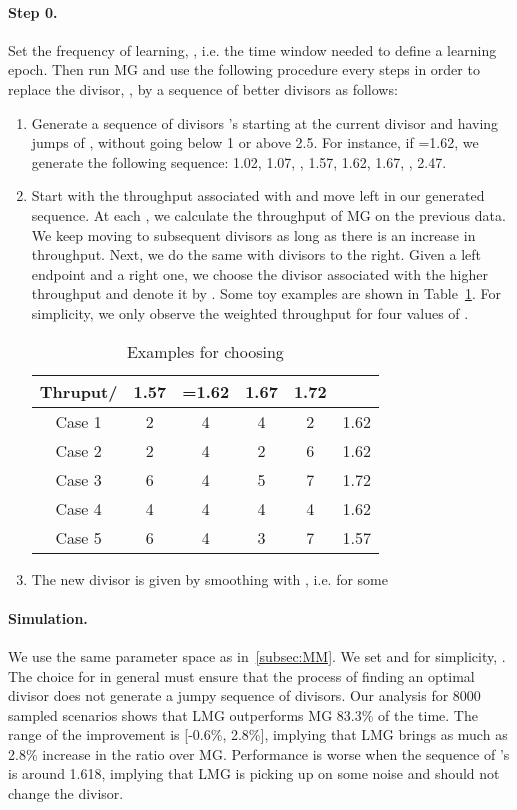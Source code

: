 \documentclass[oribibl]{llncs}
\begin{document}
\paragraph{Step 0.} Set the frequency of learning, , i.e. the time window needed to define a learning epoch. Then run MG and use the following procedure every  steps in order to replace the divisor, , by a sequence of better divisors as follows:

\begin {enumerate}
\item Generate a sequence of divisors 's starting at the current divisor  and having jumps of , without going below 1 or above 2.5. For instance, if =1.62, we generate the following sequence: 1.02, 1.07, , 1.57, 1.62, 1.67, , 2.47.

\item Start with the throughput associated with  and move left in our generated sequence. At each , we calculate the throughput of MG on the previous data. We keep moving to subsequent divisors as long as there is an increase in throughput. Next, we do the same with divisors to the right. Given a left endpoint and a right one, we choose the divisor associated with the higher throughput and denote it by . Some toy examples are shown in Table~\ref{tab:LMG}. For simplicity, we only observe the weighted throughput for four values of .

\begin{table}[ht]
\centering
 \begin{tabular}{c || c c c c || c} 
 \hline
 Thruput/  & 1.57 & =1.62 & 1.67 & 1.72 &   \\  
 \hline\hline
Case 1  & 2& 4& 4& 2&  1.62 \\ 
 \hline
Case 2  & 2& 4& 2& 6&  1.62 \\ 
 \hline 
 Case 3  & 6& 4& 5& 7 & 1.72 \\ 
 \hline
 Case 4  & 4& 4& 4& 4 & 1.62 \\ 
 \hline
 Case 5  & 6& 4& 3& 7 & 1.57 \\ 
 \hline

\end{tabular}
 \caption{Examples for choosing }
 \label{tab:LMG}
\end{table}

\item The new divisor  is given by smoothing  with , i.e. for some  
\end{enumerate}


\paragraph {Simulation.} We use the same parameter space as
in~\ref{subsec:MM}. We set  and for simplicity, . The choice for  in general must ensure that the process of finding an
optimal divisor  does not generate a jumpy sequence of
divisors. Our analysis for 8000 sampled scenarios shows that LMG outperforms MG
83.3\% of the time. The range of the improvement is [-0.6\%, 2.8\%],
implying that LMG brings as much as 2.8\% increase in the ratio over
MG. Performance is worse when the sequence of 's is
around 1.618, implying that LMG is picking up on some noise and
should not change the divisor.  
\end{document}
